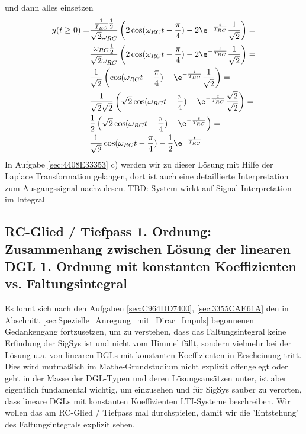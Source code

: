 \begin{Loesung}
und dann alles einsetzen
\begin{align}
y(t \geq 0) = & \frac{\frac{1}{T_{RC}} \frac{1}{2}}{\sqrt{2}\omega_{RC}} \left(2\cos(\omega_{RC} t-\frac{\pi}{4})-2\e^{-\frac{t}{T_{RC}}}\frac{1}{\sqrt{2}}\right)=\\
& \frac{\omega_{RC} \frac{1}{2}}{\sqrt{2}\omega_{RC}} \left(2\cos(\omega_{RC} t-\frac{\pi}{4})-2\e^{-\frac{t}{T_{RC}}}\frac{1}{\sqrt{2}}\right)=\\
& \frac{1}{\sqrt{2}} \left(\cos(\omega_{RC} t-\frac{\pi}{4})-\e^{-\frac{t}{T_{RC}}}\frac{1}{\sqrt{2}}\right)=\\
& \frac{1}{\sqrt{2} \sqrt{2}} \left(\sqrt{2}\cos(\omega_{RC} t-\frac{\pi}{4})-\e^{-\frac{t}{T_{RC}}}\frac{\sqrt{2}}{\sqrt{2}}\right)=\\
& \frac{1}{2} \left(\sqrt{2}\cos(\omega_{RC} t-\frac{\pi}{4})-\e^{-\frac{t}{T_{RC}}}\right)=\\
& \frac{1}{\sqrt{2}}\cos(\omega_{RC} t-\frac{\pi}{4})-\frac{1}{2}\e^{-\frac{t}{T_{RC}}}
\end{align}
In Aufgabe \ref{sec:4408E33353} c) werden wir zu dieser Lösung mit Hilfe der Laplace Transformation gelangen, dort ist auch eine detaillierte Interpretation zum Ausgangssignal nachzulesen.
TBD: System wirkt auf Signal Interpretation im Integral
\end{Loesung}

\subsection*{RC-Glied / Tiefpass 1. Ordnung: Zusammenhang zwischen Lösung der linearen DGL 1. Ordnung mit konstanten Koeffizienten vs. Faltungsintegral}
\newcommand\TRC{T_\text{RC}}

Es lohnt sich nach den Aufgaben \ref{sec:C964DD7400}, \ref{sec:3355CAE61A} den in Abschnitt \ref{sec:Spezielle_Anregung_mit_Dirac_Impuls} begonnenen Gedankengang fortzusetzen, um zu verstehen, dass das Faltungsintegral keine Erfindung der SigSys ist und nicht vom Himmel fällt, sondern vielmehr bei der Lösung u.a. von linearen DGLs mit konstanten Koeffizienten in Erscheinung tritt. Dies wird mutmaßlich im Mathe-Grundstudium nicht explizit offengelegt oder geht in der Masse der DGL-Typen und deren Lösungsansätzen unter, ist aber eigentlich fundamental wichtig, um einzusehen und für SigSys sauber zu verorten, dass lineare DGLs mit konstanten Koeffizienten LTI-Systeme beschreiben.
%
Wir wollen das am RC-Glied / Tiefpass mal durchspielen, damit wir die 'Entstehung' des Faltungsintegrals explizit sehen.

